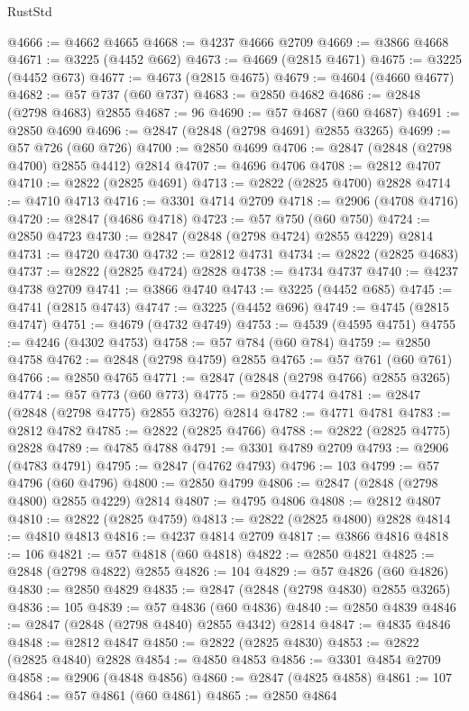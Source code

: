 \begin{lexlean}{RustStd}
\begin{coremodule}
@4666 := @4662 @4665
@4668 := @4237 @4666 @2709
@4669 := @3866 @4668
@4671 := @3225 (@4452 @662)
@4673 := @4669 (@2815 @4671)
@4675 := @3225 (@4452 @673)
@4677 := @4673 (@2815 @4675)
@4679 := @4604 (@4660 @4677)
@4682 := @57 @737 (@60 @737)
@4683 := @2850 @4682
@4686 := @2848 (@2798 @4683) @2855
@4687 := 96
@4690 := @57 @4687 (@60 @4687)
@4691 := @2850 @4690
@4696 := @2847 (@2848 (@2798 @4691) @2855 @3265)
@4699 := @57 @726 (@60 @726)
@4700 := @2850 @4699
@4706 := @2847 (@2848 (@2798 @4700) @2855 @4412) @2814
@4707 := @4696 @4706
@4708 := @2812 @4707
@4710 := @2822 (@2825 @4691)
@4713 := @2822 (@2825 @4700) @2828
@4714 := @4710 @4713
@4716 := @3301 @4714 @2709
@4718 := @2906 (@4708 @4716)
@4720 := @2847 (@4686 @4718)
@4723 := @57 @750 (@60 @750)
@4724 := @2850 @4723
@4730 := @2847 (@2848 (@2798 @4724) @2855 @4229) @2814
@4731 := @4720 @4730
@4732 := @2812 @4731
@4734 := @2822 (@2825 @4683)
@4737 := @2822 (@2825 @4724) @2828
@4738 := @4734 @4737
@4740 := @4237 @4738 @2709
@4741 := @3866 @4740
@4743 := @3225 (@4452 @685)
@4745 := @4741 (@2815 @4743)
@4747 := @3225 (@4452 @696)
@4749 := @4745 (@2815 @4747)
@4751 := @4679 (@4732 @4749)
@4753 := @4539 (@4595 @4751)
@4755 := @4246 (@4302 @4753)
@4758 := @57 @784 (@60 @784)
@4759 := @2850 @4758
@4762 := @2848 (@2798 @4759) @2855
@4765 := @57 @761 (@60 @761)
@4766 := @2850 @4765
@4771 := @2847 (@2848 (@2798 @4766) @2855 @3265)
@4774 := @57 @773 (@60 @773)
@4775 := @2850 @4774
@4781 := @2847 (@2848 (@2798 @4775) @2855 @3276) @2814
@4782 := @4771 @4781
@4783 := @2812 @4782
@4785 := @2822 (@2825 @4766)
@4788 := @2822 (@2825 @4775) @2828
@4789 := @4785 @4788
@4791 := @3301 @4789 @2709
@4793 := @2906 (@4783 @4791)
@4795 := @2847 (@4762 @4793)
@4796 := 103
@4799 := @57 @4796 (@60 @4796)
@4800 := @2850 @4799
@4806 := @2847 (@2848 (@2798 @4800) @2855 @4229) @2814
@4807 := @4795 @4806
@4808 := @2812 @4807
@4810 := @2822 (@2825 @4759)
@4813 := @2822 (@2825 @4800) @2828
@4814 := @4810 @4813
@4816 := @4237 @4814 @2709
@4817 := @3866 @4816
@4818 := 106
@4821 := @57 @4818 (@60 @4818)
@4822 := @2850 @4821
@4825 := @2848 (@2798 @4822) @2855
@4826 := 104
@4829 := @57 @4826 (@60 @4826)
@4830 := @2850 @4829
@4835 := @2847 (@2848 (@2798 @4830) @2855 @3265)
@4836 := 105
@4839 := @57 @4836 (@60 @4836)
@4840 := @2850 @4839
@4846 := @2847 (@2848 (@2798 @4840) @2855 @4342) @2814
@4847 := @4835 @4846
@4848 := @2812 @4847
@4850 := @2822 (@2825 @4830)
@4853 := @2822 (@2825 @4840) @2828
@4854 := @4850 @4853
@4856 := @3301 @4854 @2709
@4858 := @2906 (@4848 @4856)
@4860 := @2847 (@4825 @4858)
@4861 := 107
@4864 := @57 @4861 (@60 @4861)
@4865 := @2850 @4864

\end{coremodule}
\end{lexlean}

